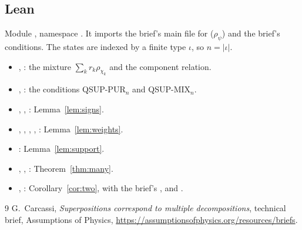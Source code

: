 \documentclass[11pt]{article}
\theoremstyle{definition}
\theoremstyle{remark}
\begin{document}
\subsection{Lean}

Module , namespace
. It imports the brief's main file for
 ($\rho_\psi$) and the brief's conditions. The states are indexed by a finite
type $\iota$, so $n = |\iota|$.

\begin{itemize}
  \item {}, : the mixture $\sum_k r_k\rho_{\chi_k}$ and the
    component relation.
  \item {}, : the conditions QSUP-PUR$_n$ and QSUP-MIX$_n$.
  \item {}, , :
    Lemma~\ref{lem:signs}.
  \item {}, , , ,
    : Lemma~\ref{lem:weights}.
  \item {}: Lemma~\ref{lem:support}.
  \item {}, , :
    Theorem~\ref{thm:many}.
  \item {}, : Corollary~\ref{cor:two}, with the
    brief's ,  and .
\end{itemize}

\begin{thebibliography}{9}
 G.~Carcassi, \emph{Superpositions correspond to multiple decompositions},
  technical brief, Assumptions of Physics,
  \url{https://assumptionsofphysics.org/resources/briefs}.
\end{thebibliography}
\end{document}
